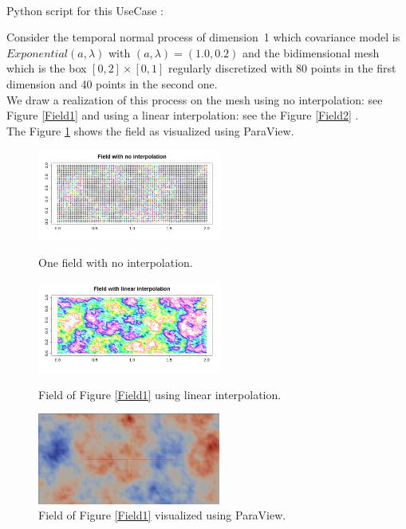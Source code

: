 \textspace\\
Python script for this UseCase :



Consider the temporal normal process of dimension~1 which covariance model is $Exponential(a,\lambda)$ with $(a, \lambda)=(1.0, 0.2)$ and the  bidimensional mesh  which is the box $[0,2]\times [0,1]$ regularly discretized with 80 points in the first dimension and 40 points in the second one. \\
We draw  a realization of this process on the mesh using no interpolation: see  Figure \ref{Field1} and using a linear interpolation: see  the Figure \ref{Field2} .\\
The Figure \ref{Field3}  shows the field as visualized using ParaView.


\begin{figure}[H]
  \begin{minipage}{6cm}
    \begin{center}
      \includegraphics[width=6cm]{Figures/Field_nointerp.png}
      \caption{One field with no interpolation.}
      \label{Field1}
    \end{center}
  \end{minipage}
  \hfill
  \begin{minipage}{6cm}
    \begin{center}
      \includegraphics[width=6cm]{Figures/Field_interp.png}
      \caption{Field of Figure \ref{Field1} using linear interpolation.}
      \label{Field2}
    \end{center}
  \end{minipage}
  \hfill
  \begin{minipage}{6cm}
    \begin{center}
      \includegraphics[width=6cm]{Figures/fieldVTK.png}
      \caption{Field of Figure \ref{Field1} visualized using ParaView.}
      \label{Field3}
    \end{center}
  \end{minipage}
\end{figure}

